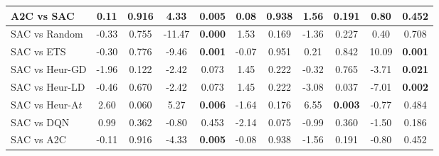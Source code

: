 \begin{tabular}{lcccccccccc}
	A2C vs SAC       & 0.11           & 0.916                  & 4.33           & \textbf{0.005}         & 0.08           & 0.938                  & 1.56           & 0.191                  & 0.80           & 0.452                  \\
	\midrule 
	SAC vs Random    & -0.33          & 0.755                  & -11.47         & \textbf{0.000}         & 1.53           & 0.169                  & -1.36          & 0.227                  & 0.40           & 0.708                  \\
	SAC vs ETS       & -0.30          & 0.776                  & -9.46          & \textbf{0.001}         & -0.07          & 0.951                  & 0.21           & 0.842                  & 10.09          & \textbf{0.001}         \\
	SAC vs Heur-GD   & -1.96          & 0.122                  & -2.42          & 0.073                  & 1.45           & 0.222                  & -0.32          & 0.765                  & -3.71          & \textbf{0.021}         \\
	SAC vs Heur-LD   & -0.46          & 0.670                  & -2.42          & 0.073                  & 1.45           & 0.222                  & -3.08          & 0.037                  & -7.01          & \textbf{0.002}         \\
	SAC vs Heur-A$t$  & 2.60           & 0.060                  & 5.27           & \textbf{0.006}         & -1.64          & 0.176                  & 6.55           & \textbf{0.003}         & -0.77          & 0.484                  \\
	SAC vs DQN       & 0.99           & 0.362                  & -0.80          & 0.453                  & -2.14          & 0.075                  & -0.99          & 0.360                  & -1.50          & 0.186                  \\
	SAC vs A2C       & -0.11          & 0.916                  & -4.33          & \textbf{0.005}         & -0.08          & 0.938                  & -1.56          & 0.191                  & -0.80          & 0.452               \\
	\bottomrule   
\end{tabular}
